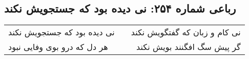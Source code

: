 \begin{center}
\section*{رباعی شماره ۲۵۴: نی دیده بود که جستجویش نکند}
\label{sec:sh254}
\begin{longtable}{l p{0.5cm} r}
نی دیده بود که جستجویش نکند
&&
نی کام و زبان که گفتگویش نکند
\\
هر دل که درو بوی وفایی نبود
&&
گر پیش سگ افگنند بویش نکند
\\
\end{longtable}
\end{center}
